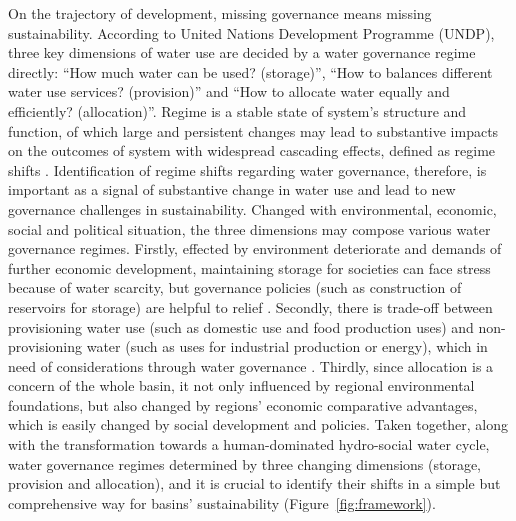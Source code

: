 \documentclass[9pt, twocolumn, twoside, lineno]{pnas-new}
\begin{document}
\label{introduction-section-2}
On the trajectory of development, missing governance means missing sustainability.
According to United Nations Development Programme (UNDP), three key dimensions of water use are decided by a water governance regime directly: ``How much water can be used? (storage)'', ``How to balances different water use services? (provision)'' and ``How to allocate water equally and efficiently? (allocation)''.
Regime is a stable state of system’s structure and function, of which large and persistent changes may lead to substantive impacts on the outcomes of system with widespread cascading effects, defined as regime shifts 
\cite{rochaCascadingRegimeShifts2018,schefferCatastrophicRegimeShifts2003, schefferCatastrophicShiftsEcosystems2001}.
Identification of regime shifts regarding water governance, therefore, is important as a signal of substantive change in water use and lead to new governance challenges in sustainability.
Changed with environmental, economic, social and political situation, the three dimensions may compose various water governance regimes. 
Firstly, effected by environment deteriorate and demands of further economic development, maintaining storage for societies can face stress because of water scarcity, but governance policies (such as construction of reservoirs for storage) are helpful to relief
\cite{postelHumanAppropriationRenewable1996, greveGlobalAssessmentWater2018, qinFlexibilityIntensityGlobal2019}.
Secondly, there is trade-off between provisioning water use (such as domestic use and food production uses) and non-provisioning water (such as uses for industrial production or energy), which in need of considerations through water governance
\cite{liuWaterScarcityAssessments2017, florkeWaterCompetitionCities2018}.
Thirdly, since allocation is a concern of the whole basin, it not only influenced by regional environmental foundations, but also changed by regions' economic comparative advantages, which is easily changed by social development and policies.
Taken together, along with the transformation towards a human-dominated hydro-social water cycle, water governance regimes determined by three changing dimensions (storage, provision and allocation), and it is crucial to identify their shifts in a simple but comprehensive way for basins' sustainability (Figure~\ref{fig:framework}).
\end{document}
